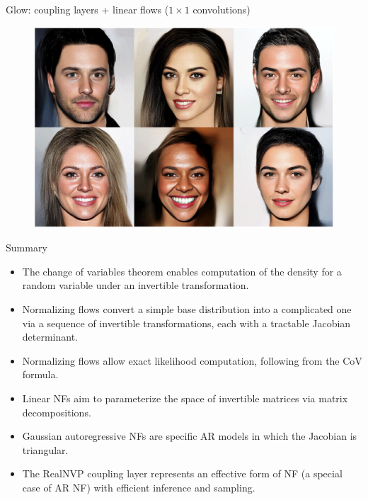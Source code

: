 \documentclass{beamer}
\begin{document}
\begin{frame}{Glow: coupling layers + linear flows ($1 \times 1$ convolutions)}
	\begin{figure}
		\centering
		\includegraphics[width=0.9\linewidth]{figs/glow_faces.png}
	\end{figure}
\end{frame}
\begin{frame}{Summary}
	\begin{itemize}
		\item The change of variables theorem enables computation of the density for a random variable under an invertible transformation.
		\vfill
		\item Normalizing flows convert a simple base distribution into a complicated one via a sequence of invertible transformations, each with a tractable Jacobian determinant.
		\vfill
		\item Normalizing flows allow exact likelihood computation, following from the CoV formula.
		\vfill
		\item Linear NFs aim to parameterize the space of invertible matrices via matrix decompositions.
		\vfill
		\item Gaussian autoregressive NFs are specific AR models in which the Jacobian is triangular.
		\vfill
		\item The RealNVP coupling layer represents an effective form of NF (a special case of AR NF) with efficient inference and sampling.
	\end{itemize}
\end{frame}
\end{document}
